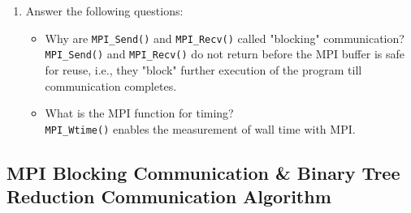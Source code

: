 \documentclass[12pt]{article}
\begin{document}
\begin{enumerate}
    \item Answer the following questions:
    \begin{itemize}
        \item Why are \texttt{MPI\_Send()} and \texttt{MPI\_Recv()} called "blocking" communication?\\
         \texttt{MPI\_Send()} and \texttt{MPI\_Recv()} do not return before the MPI buffer is safe for reuse, i.e., they "block" further execution of the program till communication completes.
        \item What is the MPI function for timing?\\
        \texttt{MPI\_Wtime()} enables the measurement of wall time with MPI.
    \end{itemize}
\end{enumerate}

\subsection{MPI Blocking Communication \& Binary Tree Reduction Communication Algorithm}
\end{document}
